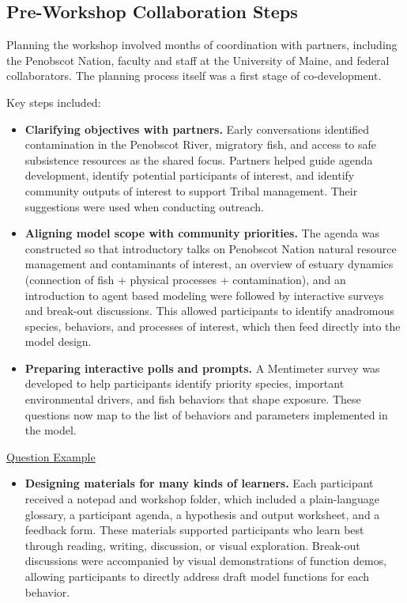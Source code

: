 \documentclass[
]{book}
\providecommand{\tightlist}{%
  \setlength{\itemsep}{0pt}\setlength{\parskip}{0pt}}
\begin{document}
\subsection{Pre-Workshop Collaboration Steps}\label{pre-workshop-collaboration-steps}

Planning the workshop involved months of coordination with partners, including the Penobscot Nation, faculty and staff at the University of Maine, and federal collaborators. The planning process itself was a first stage of co-development.

Key steps included:

\begin{itemize}
\item
  \textbf{Clarifying objectives with partners.} Early conversations identified contamination in the Penobscot River, migratory fish, and access to safe subsistence resources as the shared focus. Partners helped guide agenda development, identify potential participants of interest, and identify community outputs of interest to support Tribal management. Their suggestions were used when conducting outreach.
\item
  \textbf{Aligning model scope with community priorities.} The agenda was constructed so that introductory talks on Penobscot Nation natural resource management and contaminants of interest, an overview of estuary dynamics (connection of fish + physical processes + contamination), and an introduction to agent based modeling were followed by interactive surveys and break-out discussions. This allowed participants to identify anadromous species, behaviors, and processes of interest, which then feed directly into the model design.
\item
  \textbf{Preparing interactive polls and prompts.} A Mentimeter survey was developed to help participants identify priority species, important environmental drivers, and fish behaviors that shape exposure. These questions now map to the list of behaviors and parameters implemented in the model.
\end{itemize}

\href{materials/Mentimeter\%20Survey_10.docx}{Question Example}

\begin{itemize}
\tightlist
\item
  \textbf{Designing materials for many kinds of learners.} Each participant received a notepad and workshop folder, which included a plain-language glossary, a participant agenda, a hypothesis and output worksheet, and a feedback form. These materials supported participants who learn best through reading, writing, discussion, or visual exploration. Break-out discussions were accompanied by visual demonstrations of function demos, allowing participants to directly address draft model functions for each behavior.
\end{itemize}
\end{document}
